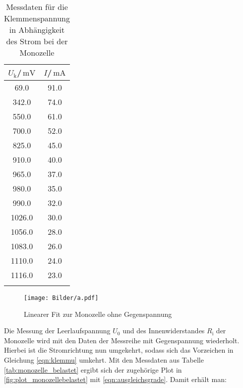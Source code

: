 \begin{table}
  \centering
  \caption{Messdaten für die Klemmenspannung in Abhängigkeit des Strom bei der Monozelle}
  \label{tab:mono}

\begin{tabular}{cc}
  \toprule
$U_\text{k}$/$\,\si{\milli\volt}$ & $I$/$\,\si{\milli\ampere}$\\
\midrule
69.0 & 91.0 \\
342.0 & 74.0 \\
550.0 & 61.0 \\
700.0 & 52.0 \\
825.0 & 45.0 \\
910.0 & 40.0 \\
965.0 & 37.0 \\
980.0 & 35.0 \\
990.0 & 32.0 \\
1026.0 & 30.0 \\
1056.0 & 28.0 \\
1083.0 & 26.0 \\
1110.0 & 24.0 \\
1116.0 & 23.0 \\
\bottomrule
\label{tab:labbadia}
\end{tabular}
\end{table}
\begin{figure}
\texttt{[image: Bilder/a.pdf]}
\caption{Linearer Fit zur Monozelle ohne Gegenspannung}
\label{fig:plot_a}
\end{figure}


Die Messung der Leerlaufspannung $U_\text{0}$ und des Innenwiderstandes $R_{\text{i}}$ der Monozelle wird mit den Daten der Messreihe mit Gegenspannung wiederholt. Hierbei ist die Stromrichtung nun umgekehrt, sodass sich das Vorzeichen in Gleichung \eqref{eqn:klemmu} umkehrt.
Mit den Messdaten aus Tabelle \ref{tab:monozelle_belastet} ergibt sich der zugehörige Plot in \ref{fig:plot_monozellebelastet} mit \eqref{eqn:ausgleichsgrade}. Damit erhält man:

